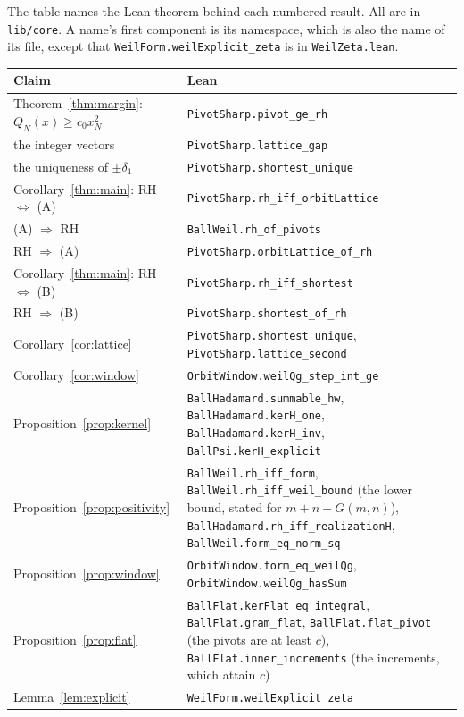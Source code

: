 \documentclass[11pt]{article}
\theoremstyle{definition}
\newcommand{\lean}[1]{\texttt{#1}}
\newcommand{\file}[1]{\nolinkurl{#1}}
\begin{document}
The table names the Lean theorem behind each numbered result. All are in \file{lib/core}. A name's first component is
its namespace, which is also the name of its file, except that \lean{WeilForm.weilExplicit\_zeta} is in
\file{WeilZeta.lean}.
{\footnotesize
\begin{longtable}{@{}p{}>{\raggedright\arraybackslash}p{}@{}}
\toprule
Claim & Lean \\
\midrule
\endhead
Theorem~\ref{thm:margin}: $Q_N(x) \ge c_0 x_N^2$ & \lean{PivotSharp.pivot\_ge\_rh} \\
\quad the integer vectors & \lean{PivotSharp.lattice\_gap} \\
\quad the uniqueness of $\pm\delta_1$ & \lean{PivotSharp.shortest\_unique} \\
Corollary~\ref{thm:main}: RH $\iff$ (A) & \lean{PivotSharp.rh\_iff\_orbitLattice} \\
\quad (A) $\Rightarrow$ RH & \lean{BallWeil.rh\_of\_pivots} \\
\quad RH $\Rightarrow$ (A) & \lean{PivotSharp.orbitLattice\_of\_rh} \\
Corollary~\ref{thm:main}: RH $\iff$ (B) & \lean{PivotSharp.rh\_iff\_shortest} \\
\quad RH $\Rightarrow$ (B) & \lean{PivotSharp.shortest\_of\_rh} \\
Corollary~\ref{cor:lattice} & \lean{PivotSharp.shortest\_unique}, \lean{PivotSharp.lattice\_second} \\
Corollary~\ref{cor:window} & \lean{OrbitWindow.weilQg\_step\_int\_ge} \\
Proposition~\ref{prop:kernel} & \lean{BallHadamard.summable\_hw}, \lean{BallHadamard.kerH\_one},
\lean{BallHadamard.kerH\_inv},
\lean{BallPsi.kerH\_explicit} \\
Proposition~\ref{prop:positivity} & \lean{BallWeil.rh\_iff\_form},
\lean{BallWeil.rh\_iff\_weil\_bound} (the lower bound,
stated for $m + n - G(m, n)$), \lean{BallHadamard.rh\_iff\_realizationH},
\lean{BallWeil.form\_eq\_norm\_sq} \\
Proposition~\ref{prop:window} & \lean{OrbitWindow.form\_eq\_weilQg}, \lean{OrbitWindow.weilQg\_hasSum} \\
Proposition~\ref{prop:flat} & \lean{BallFlat.kerFlat\_eq\_integral}, \lean{BallFlat.gram\_flat},
\lean{BallFlat.flat\_pivot} (the pivots are at least $c$),
\lean{BallFlat.inner\_increments} (the increments, which attain $c$) \\
Lemma~\ref{lem:explicit} & \lean{WeilForm.weilExplicit\_zeta} \\

\end{longtable}}
\end{document}
